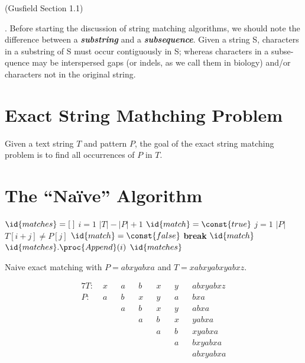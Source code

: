 (Gusfield Section 1.1)

. Before starting the discussion of string matching algorithms, we should note the difference between a \textit{\textbf{substring}} and a \textit{\textbf{subsequence}}. Given a string S, characters in a substring of S must occur contiguously in S; whereas characters in a subse- quence may be interspersed gaps (or indels, as we call them in biology) and/or characters not in the original string.

\section{Exact String Mathching Problem}

Given a text string $T$ and pattern $P$, the goal of the exact string matching problem is to find all occurrences of $P$ in $T$.

\section{The ``Na\"ive'' Algorithm} 

\begin{codebox}
    \li $\id{matches} = [\;]$
    \li \For $i=1$ \To $|T|-|P|+1$ \Do
        \li $\id{match} = \const{true}$
        \li \For $j = 1$ \To $|P|$ \Do
            \li \If $T[i+j] \neq P[j]$ \Then
                \li $\id{match} = \const{false}$
                \li \textbf{break}
            \End
        \li \If $\id{match}$ \Then
            \li $\id{matches}.\proc{Append}(i)$ 
        \End
    \End
    \li \Return $\id{matches}$ 
\end{codebox}

\begin{marginfigure}
    \caption{Naive exact matching with $P=abxyabxa$ and $T=xabxyabxyabxz$.}
    \begin{alignat*}{7}
        T:\; &x&&a&&b&&x&&y&&abxyabxz \\
        P:\; &a&&b&&x&&y&&a&&bxa \\
        & && a&&b&&x&&y&&abxa \\
        & && && a&&b&&x&&yabxa \\
        & && && && a&&b&&xyabxa \\
        & && && && && a &&bxyabxa \\
        & && && && && && abxyabxa \\
    \end{alignat*}
    \label{fig:naive-matching}
\end{marginfigure}

